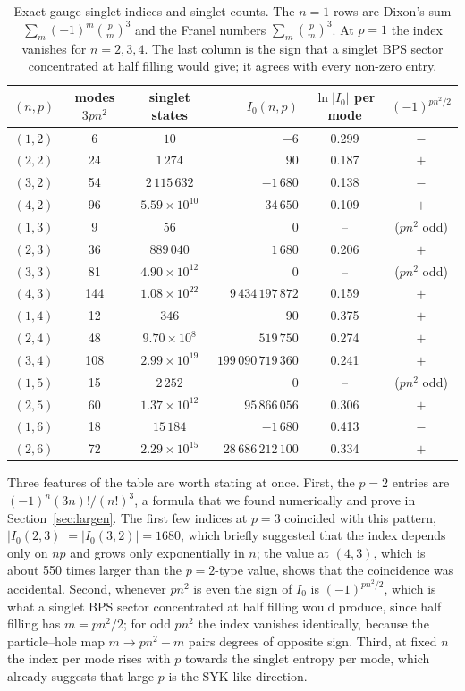 \documentclass[10pt]{article}
\begin{document}
\begin{table}[t]\centering\small
\begin{tabular}{cccrcc}
\toprule
$(n,p)$ & modes $3pn^2$ & singlet states & $I_0(n,p)$ & $\ln|I_0|$ per mode & $(-1)^{pn^2/2}$ \\
\midrule
$(1,2)$ & 6 & $10$ & $-6$ & 0.299 & $-$\\
$(2,2)$ & 24 & $1\,274$ & $90$ & 0.187 & $+$\\
$(3,2)$ & 54 & $2\,115\,632$ & $-1\,680$ & 0.138 & $-$\\
$(4,2)$ & 96 & $5.59\times10^{10}$ & $34\,650$ & 0.109 & $+$\\
\midrule
$(1,3)$ & 9 & $56$ & $0$ & -- & ($pn^2$ odd)\\
$(2,3)$ & 36 & $889\,040$ & $1\,680$ & 0.206 & $+$\\
$(3,3)$ & 81 & $4.90\times10^{12}$ & $0$ & -- & ($pn^2$ odd)\\
$(4,3)$ & 144 & $1.08\times10^{22}$ & $9\,434\,197\,872$ & 0.159 & $+$\\
\midrule
$(1,4)$ & 12 & $346$ & $90$ & 0.375 & $+$\\
$(2,4)$ & 48 & $9.70\times10^{8}$ & $519\,750$ & 0.274 & $+$\\
$(3,4)$ & 108 & $2.99\times10^{19}$ & $199\,090\,719\,360$ & 0.241 & $+$\\
\midrule
$(1,5)$ & 15 & $2\,252$ & $0$ & -- & ($pn^2$ odd)\\
$(2,5)$ & 60 & $1.37\times10^{12}$ & $95\,866\,056$ & 0.306 & $+$\\
$(1,6)$ & 18 & $15\,184$ & $-1\,680$ & 0.413 & $-$\\
$(2,6)$ & 72 & $2.29\times10^{15}$ & $28\,686\,212\,100$ & 0.334 & $+$\\
\bottomrule
\end{tabular}
\caption{Exact gauge-singlet indices and singlet counts. The $n=1$ rows are Dixon's sum
$\sum_m(-1)^m\binom pm^3$ and the Franel numbers $\sum_m\binom pm^3$. At $p=1$ the index vanishes for $n=2,3,4$. The
last column is the sign that a singlet BPS sector concentrated at half filling would give; it agrees with every
non-zero entry.}
\label{tab:index}
\end{table}

Three features of the table are worth stating at once. First, the $p=2$ entries are $(-1)^n(3n)!/(n!)^3$, a
formula that we found numerically and prove in Section~\ref{sec:largen}. The first few indices at $p=3$ coincided
with this pattern, $|I_0(2,3)|=|I_0(3,2)|=1680$, which briefly suggested that the index depends only on $np$ and
grows only exponentially in $n$; the value at $(4,3)$, which is about 550 times larger than the $p=2$-type value,
shows that the coincidence was accidental. Second, whenever $pn^2$ is even the sign of $I_0$ is $(-1)^{pn^2/2}$,
which is what a singlet BPS sector concentrated at half filling would produce, since half filling has
$m=pn^2/2$; for odd $pn^2$ the index vanishes identically, because the particle--hole map $m\to pn^2-m$ pairs
degrees of opposite sign. Third, at fixed $n$ the index per mode rises with $p$ towards the singlet entropy per
mode, which already suggests that large $p$ is the SYK-like direction.
\end{document}
